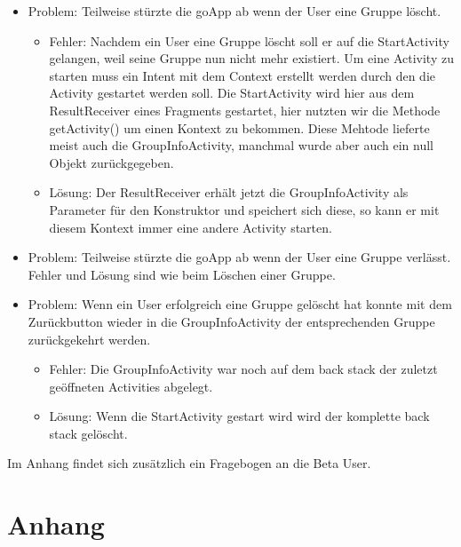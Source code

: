 \documentclass{scrartcl}
\begin{document}
		\begin{itemize}
			\item Problem: Teilweise stürzte die goApp ab wenn der User eine Gruppe löscht.
			\begin{itemize}
				\item Fehler: Nachdem ein User eine Gruppe löscht soll er auf die StartActivity gelangen, weil seine Gruppe nun nicht mehr existiert. Um eine Activity zu starten muss ein Intent mit dem Context erstellt werden durch den die  Activity gestartet werden soll. Die StartActivity wird hier aus dem ResultReceiver eines Fragments gestartet, hier nutzten wir die Methode getActivity() um einen Kontext zu bekommen. Diese Mehtode lieferte meist auch die GroupInfoActivity, manchmal wurde aber auch ein null Objekt zurückgegeben.
				\item Lösung: Der ResultReceiver erhält jetzt die GroupInfoActivity als Parameter für den Konstruktor und speichert sich diese, so kann er mit diesem Kontext immer eine andere Activity starten.
			\end{itemize}

			\item Problem: Teilweise stürzte die goApp ab wenn der User eine Gruppe verlässt. Fehler und Lösung sind wie beim Löschen einer Gruppe.

			\item Problem: Wenn ein User erfolgreich eine Gruppe gelöscht hat konnte mit dem Zurückbutton wieder in die GroupInfoActivity der entsprechenden Gruppe zurückgekehrt werden.
			\begin{itemize}
				\item Fehler: Die GroupInfoActivity war noch auf dem back stack der zuletzt geöffneten Activities abgelegt. 
				\item Lösung: Wenn die StartActivity gestart wird wird der komplette back stack gelöscht.
			\end{itemize}

			
		\end{itemize}
	
		Im Anhang findet sich zusätzlich ein Fragebogen an die Beta User.

\section{Anhang}
\end{document}
